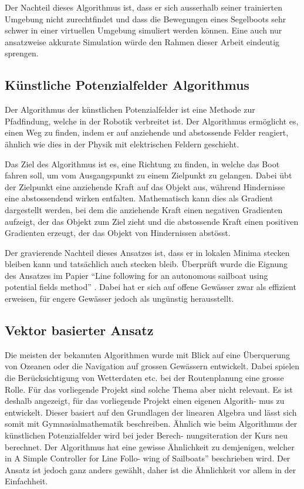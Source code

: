 Der Nachteil dieses Algorithmus ist, dass er sich ausserhalb seiner trainierten Umgebung nicht zurechtfindet und dass die Bewegungen eines Segelboots sehr schwer in einer virtuellen Umgebung simuliert werden können. Eine auch nur ansatzweise akkurate Simulation würde den Rahmen dieser Arbeit eindeutig sprengen.
\subsection{Künstliche Potenzialfelder Algorithmus} 
Der Algorithmus der künstlichen Potenzialfelder ist eine Methode zur Pfadfindung, welche in der Robotik verbreitet ist. Der Algorithmus ermöglicht es, einen Weg zu finden, indem er auf anziehende und abstossende Felder reagiert, ähnlich wie dies in der Physik mit elektrischen Feldern geschieht.

Das Ziel des Algorithmus ist es, eine Richtung zu finden, in welche das Boot fahren soll, um vom Ausgangspunkt zu einem Zielpunkt zu gelangen. Dabei übt der Zielpunkt eine anziehende Kraft auf das Objekt aus, während Hindernisse eine abstossendend wirken entfalten. Mathematisch kann dies als Gradient dargestellt werden, bei dem die anziehende Kraft einen negativen Gradienten aufzeigt, der das Objekt zum Ziel zieht und die abstossende Kraft einen positiven Gradienten erzeugt, der das Objekt von Hindernissen abstösst.

Der gravierende Nachteil dieses Ansatzes ist, dass er in lokalen Minima stecken bleiben kann und tatsächlich auch stecken bleib. Überprüft wurde die Eignung des Ansatzes im Papier \enquote{Line following for an autonomous sailboat using potential ﬁelds method} \cite{inproceedings} . Dabei hat er sich auf offene Gewässer zwar als effizient erweisen, für engere Gewässer jedoch als ungünstig herausstellt.
\subsection{Vektor basierter Ansatz}


Die meisten der bekannten Algorithmen wurde mit Blick auf eine Überquerung
von Ozeanen oder die Navigation auf grossen Gewässern entwickelt. Dabei
spielen die Berücksichtigung von Wetterdaten etc. bei der Routenplanung
eine grosse Rolle. Für das vorliegende Projekt sind solche Thema aber nicht
relevant.
Es ist deshalb angezeigt, für das vorliegende Projekt einen eigenen Algorith-
mus zu entwickelt. Dieser basiert auf den Grundlagen der linearen Algebra
und lässt sich somit mit Gymnasialmathematik beschreiben. Ähnlich wie
beim Algorithmus der künstlichen Potenzialfelder wird bei jeder Berech-
nungsiteration der Kurs neu berechnet. Der Algorithmus hat eine gewisse
Ähnlichkeit zu demjenigen, welcher in A Simple Controller for Line Follo-
wing of Sailboats” beschrieben wird. \cite{sauze_simple_2013} Der Ansatz ist jedoch ganz anders
gewählt, daher ist die Ähnlichkeit vor allem in der Einfachheit. 


